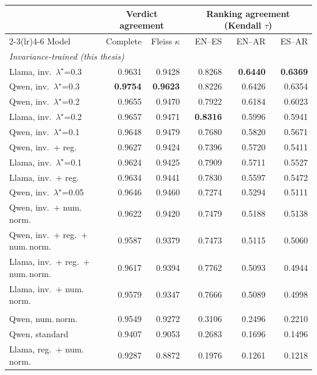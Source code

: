 \begin{table}[htbp]
\centering\small\setlength{\tabcolsep}{5pt}
\begin{tabular}{l rr rrr}
\toprule
& \multicolumn{2}{c}{Verdict agreement} & \multicolumn{3}{c}{Ranking agreement (Kendall $\tau$)} \\
\cmidrule(lr){2-3}\cmidrule(lr){4-6}
Model & Complete & Fleiss $\kappa$ & EN--ES & EN--AR & ES--AR \\
\midrule
\multicolumn{6}{l}{\itshape Invariance-trained (this thesis)}\\
\quad Llama, inv.\ $\lambda^\star$=0.3 & 0.9631 & 0.9428 & 0.8268 & \textbf{0.6440} & \textbf{0.6369} \\
\quad Qwen, inv.\ $\lambda^\star$=0.3 & \textbf{0.9754} & \textbf{0.9623} & 0.8226 & 0.6426 & 0.6354 \\
\quad Qwen, inv.\ $\lambda^\star$=0.2 & 0.9655 & 0.9470 & 0.7922 & 0.6184 & 0.6023 \\
\quad Llama, inv.\ $\lambda^\star$=0.2 & 0.9657 & 0.9471 & \textbf{0.8316} & 0.5996 & 0.5941 \\
\quad Qwen, inv.\ $\lambda^\star$=0.1 & 0.9648 & 0.9479 & 0.7680 & 0.5820 & 0.5671 \\
\quad Qwen, inv.\ + reg. & 0.9627 & 0.9424 & 0.7396 & 0.5720 & 0.5411 \\
\quad Llama, inv.\ $\lambda^\star$=0.1 & 0.9624 & 0.9425 & 0.7909 & 0.5711 & 0.5527 \\
\quad Llama, inv.\ + reg. & 0.9634 & 0.9441 & 0.7830 & 0.5597 & 0.5472 \\
\quad Qwen, inv.\ $\lambda^\star$=0.05 & 0.9646 & 0.9460 & 0.7274 & 0.5294 & 0.5111 \\
\quad Qwen, inv.\ + num.\,norm. & 0.9622 & 0.9420 & 0.7479 & 0.5188 & 0.5138 \\
\quad Qwen, inv.\ + reg.\ + num.\,norm. & 0.9587 & 0.9379 & 0.7473 & 0.5115 & 0.5060 \\
\quad Llama, inv.\ + reg.\ + num.\,norm. & 0.9617 & 0.9394 & 0.7762 & 0.5093 & 0.4944 \\
\quad Llama, inv.\ + num.\,norm. & 0.9579 & 0.9347 & 0.7666 & 0.5089 & 0.4998 \\
\addlinespace[3pt]
\multicolumn{6}{l}{\itshape Standard multilingual fine-tuning}\\
\quad Qwen, num.\,norm. & 0.9549 & 0.9272 & 0.3106 & 0.2496 & 0.2210 \\
\quad Qwen, standard & 0.9407 & 0.9053 & 0.2683 & 0.1696 & 0.1496 \\
\quad Llama, reg.\ + num.\,norm. & 0.9287 & 0.8872 & 0.1976 & 0.1261 & 0.1218 \\

\end{tabular}
\end{table}
